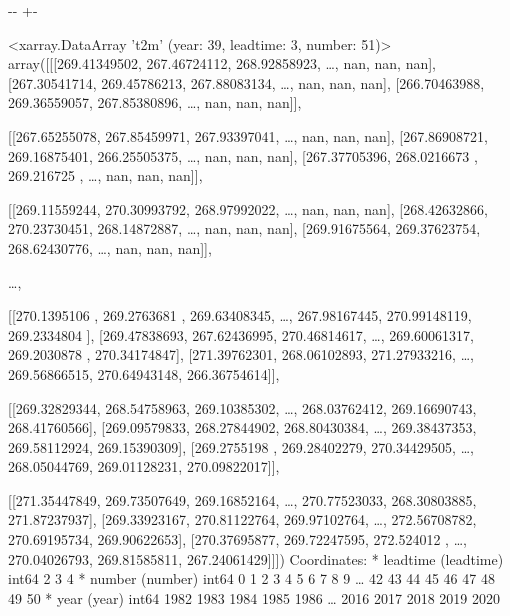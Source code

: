 \documentclass[letterpaper,10pt,english]{sphinxmanual}
\newlength\nbsphinxcodecellspacing
\begin{document}
{

\kern-\sphinxverbatimsmallskipamount\kern-\baselineskip
\kern+\FrameHeightAdjust\kern-\fboxrule
\vspace{\nbsphinxcodecellspacing}

\begin{sphinxVerbatim}[commandchars=\\\{\}]
\llap{\color{nbsphinxout}[39]:\,\hspace{\fboxrule}\hspace{\fboxsep}}<xarray.DataArray 't2m' (year: 39, leadtime: 3, number: 51)>
array([[[269.41349502, 267.46724112, 268.92858923, {\ldots},          nan,
                  nan,          nan],
        [267.30541714, 269.45786213, 267.88083134, {\ldots},          nan,
                  nan,          nan],
        [266.70463988, 269.36559057, 267.85380896, {\ldots},          nan,
                  nan,          nan]],

       [[267.65255078, 267.85459971, 267.93397041, {\ldots},          nan,
                  nan,          nan],
        [267.86908721, 269.16875401, 266.25505375, {\ldots},          nan,
                  nan,          nan],
        [267.37705396, 268.0216673 , 269.216725  , {\ldots},          nan,
                  nan,          nan]],

       [[269.11559244, 270.30993792, 268.97992022, {\ldots},          nan,
                  nan,          nan],
        [268.42632866, 270.23730451, 268.14872887, {\ldots},          nan,
                  nan,          nan],
        [269.91675564, 269.37623754, 268.62430776, {\ldots},          nan,
                  nan,          nan]],

       {\ldots},

       [[270.1395106 , 269.2763681 , 269.63408345, {\ldots}, 267.98167445,
         270.99148119, 269.2334804 ],
        [269.47838693, 267.62436995, 270.46814617, {\ldots}, 269.60061317,
         269.2030878 , 270.34174847],
        [271.39762301, 268.06102893, 271.27933216, {\ldots}, 269.56866515,
         270.64943148, 266.36754614]],

       [[269.32829344, 268.54758963, 269.10385302, {\ldots}, 268.03762412,
         269.16690743, 268.41760566],
        [269.09579833, 268.27844902, 268.80430384, {\ldots}, 269.38437353,
         269.58112924, 269.15390309],
        [269.2755198 , 269.28402279, 270.34429505, {\ldots}, 268.05044769,
         269.01128231, 270.09822017]],

       [[271.35447849, 269.73507649, 269.16852164, {\ldots}, 270.77523033,
         268.30803885, 271.87237937],
        [269.33923167, 270.81122764, 269.97102764, {\ldots}, 272.56708782,
         270.69195734, 269.90622653],
        [270.37695877, 269.72247595, 272.524012  , {\ldots}, 270.04026793,
         269.81585811, 267.24061429]]])
Coordinates:
  * leadtime  (leadtime) int64 2 3 4
  * number    (number) int64 0 1 2 3 4 5 6 7 8 9 {\ldots} 42 43 44 45 46 47 48 49 50
  * year      (year) int64 1982 1983 1984 1985 1986 {\ldots} 2016 2017 2018 2019 2020
\end{sphinxVerbatim}
}
\end{document}
